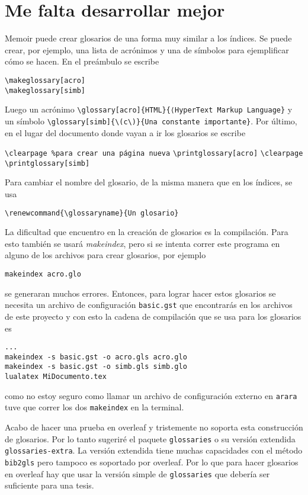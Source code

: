 \section{Me falta desarrollar mejor}
Memoir puede crear glosarios de una forma muy similar a los índices. Se puede crear, por ejemplo, una lista de acrónimos y una de símbolos para
ejemplificar cómo se hacen. En el preámbulo se escribe
\begin{flushleft}
  \verb|\makeglossary[acro]|\\
  \verb|\makeglossary[simb]|
\end{flushleft}
Luego un acrónimo \verb|\glossary[acro]{HTML}{⟨HyperText Markup Language}| y un
símbolo \verb|\glossary[simb]{\(c\)}{Una constante importante}|. Por último,
en el lugar del documento donde vayan a ir los glosarios se escribe
\begin{flushleft}
  \verb|\clearpage %para crear una página nueva|
  \verb|\printglossary[acro]|
  \verb|\clearpage|
  \verb|\printglossary[simb]|
\end{flushleft}
Para cambiar el nombre del glosario, de la misma manera que en los índices, se usa
\begin{flushleft}
  \verb|\renewcommand{\glossaryname}{Un glosario}|
\end{flushleft}

La dificultad que encuentro en la creación de glosarios es la compilación.
Para esto también se usará \textit{makeindex}, pero si se intenta correr
este programa en alguno de los archivos para crear glosarios, por ejemplo
\begin{flushleft}
  \verb|makeindex acro.glo|
\end{flushleft}
se generaran muchos errores. Entonces, para lograr hacer estos glosarios se
necesita un archivo de configuración \texttt{basic.gst} que encontrarás en
los archivos de este proyecto y con esto la cadena de compilación que se usa para los glosarios es
\begin{flushleft}
  \verb|...|\\
  \verb|makeindex -s basic.gst -o acro.gls acro.glo|\\
  \verb|makeindex -s basic.gst -o simb.gls simb.glo|\\
  \verb|lualatex MiDocumento.tex|
\end{flushleft}
como no estoy seguro como llamar un archivo de configuración externo en
\texttt{arara} tuve que correr los dos \texttt{makeindex} en la terminal.

Acabo de hacer una prueba en overleaf y tristemente no soporta esta
construcción  de glosarios. Por lo tanto sugeriré el paquete
\texttt{glossaries} o su versión extendida \texttt{glossaries-extra}. La
versión extendida tiene muchas capacidades con el método \texttt{bib2gls} pero
tampoco es soportado por overleaf. Por lo que para hacer glosarios en overleaf
hay que usar la versión simple de \texttt{glossaries} que debería ser
suficiente para una tesis.
